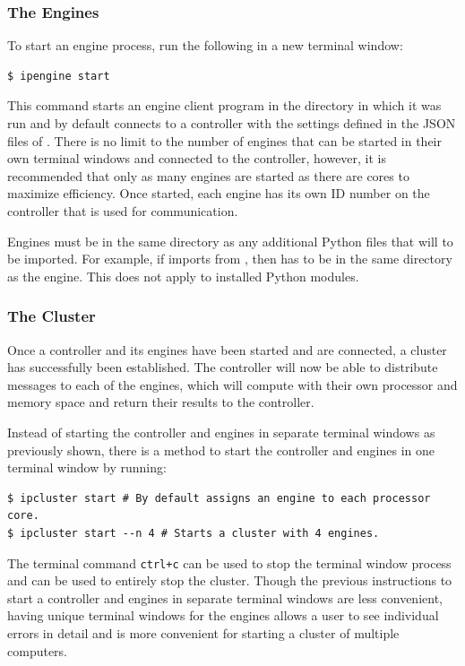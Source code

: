 \subsubsection*{The Engines}
To start an engine process, run the following in a new terminal window:
\begin{lstlisting}[style=ShellInput]
$ ipengine start
\end{lstlisting}

This command starts an engine client program in the directory in which it was run and by default connects to a controller with the settings defined in the JSON files of .
There is no limit to the number of engines that can be started in their own terminal windows and connected to the controller, however, it is recommended that only as many engines are started as there are cores to maximize efficiency. 
Once started, each engine has its own ID number on the controller that is used for communication.

\begin{warn}
Engines must be in the same directory as any additional Python files that will to be imported.
For example, if  imports  from , then  has to be in the same directory as the engine.
This does not apply to installed Python modules.
\end{warn}

\subsubsection*{The Cluster}
Once a controller and its engines have been started and are connected, a cluster has successfully been established.
The controller will now be able to distribute messages to each of the engines, which will compute with their own processor and memory space and return their results to the controller.

Instead of starting the controller and engines in separate terminal windows as previously shown, there is a method to start the controller and engines in one terminal window by running:
\begin{lstlisting}[style=ShellInput]
$ ipcluster start # By default assigns an engine to each processor core.
$ ipcluster start --n 4 # Starts a cluster with 4 engines.
\end{lstlisting}

The terminal command \texttt{ctrl+c} can be used to stop the terminal window process and  can be used to entirely stop the cluster.
Though the previous instructions to start a controller and engines in separate terminal windows are less convenient, having unique terminal windows for the engines allows a user to see individual errors in detail and is more convenient for starting a cluster of multiple computers.

